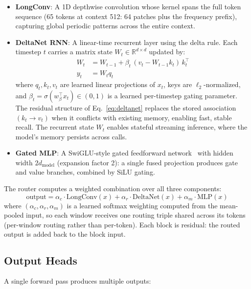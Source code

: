 \documentclass[11pt]{article}
\begin{document}
\begin{itemize}
\item \textbf{LongConv}: A 1D depthwise convolution whose kernel spans the full token sequence (65 tokens at context 512: 64 patches plus the frequency prefix), capturing global periodic patterns across the entire context.
\item \textbf{DeltaNet RNN}: A linear-time recurrent layer using the delta rule. Each timestep $t$ carries a matrix state $W_t \in \mathbb{R}^{d \times d}$ updated by:
\begin{align}
W_t &= W_{t-1} + \beta_t \,(v_t - W_{t-1} k_t)\, k_t^\top \label{eq:deltanet}\\
y_t &= W_t q_t
\end{align}
where $q_t, k_t, v_t$ are learned linear projections of $x_t$, keys are $\ell_2$-normalized, and $\beta_t = \sigma(w_\beta^\top x_t) \in (0,1)$ is a learned per-timestep gating parameter. The residual structure of Eq.~\ref{eq:deltanet} replaces the stored association $(k_t \to v_t)$ when it conflicts with existing memory, enabling fast, stable recall. The recurrent state $W_t$ enables stateful streaming inference, where the model's memory persists across calls.
\item \textbf{Gated MLP}: A SwiGLU-style gated feedforward network~\cite{swiglu} with hidden width $2d_{\text{model}}$ (expansion factor 2): a single fused projection produces gate and value branches, combined by SiLU gating.
\end{itemize}

The router computes a weighted combination over all three components:
\begin{equation}
\text{output} = \alpha_c \cdot \text{LongConv}(x) + \alpha_r \cdot \text{DeltaNet}(x) + \alpha_m \cdot \text{MLP}(x)
\label{eq:router}
\end{equation}
where $(\alpha_c, \alpha_r, \alpha_m)$ is a learned softmax weighting computed from the mean-pooled input, so each window receives one routing triple shared across its tokens (per-window routing rather than per-token). Each block is residual: the routed output is added back to the block input.

\subsection{Output Heads}
\label{sec:heads}

A single forward pass produces multiple outputs:
\end{document}
